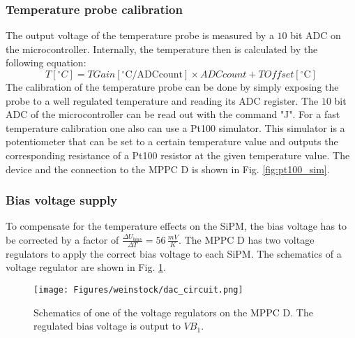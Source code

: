 \documentclass[]{article}
\begin{document}
\subsubsection*{Temperature probe calibration}

The output voltage of the temperature probe is measured by a $10$ bit ADC on the microcontroller. Internally, the temperature then is calculated by the following equation:
\begin{equation}
	T[^{\circ}C] = TGain[^{\circ}\text{C/ADCcount}] \times ADCcount + TOffset[^{\circ}\text{C}] 	
\end{equation}
The calibration of the temperature probe can be done by simply exposing the probe to a well regulated temperature and reading its ADC register. The $10$ bit ADC of the microcontroller
can be read out with the command "J". For a fast temperature calibration one also can use a Pt100 simulator. This simulator is a potentiometer that can be set to a certain 
temperature value and outputs the corresponding resistance of a Pt100 resistor at the given temperature value. The device and the connection to the MPPC D is shown in Fig. \ref{fig:pt100_sim}.

\newpage

\subsubsection{Bias voltage supply}

To compensate for the temperature effects on the SiPM, the bias voltage has to be corrected by a factor of $\frac{\Delta U_{bias}}{\Delta T} = 56\,\frac{mV}{K}$. The MPPC D has two 
voltage regulators to apply the correct bias voltage to each SiPM. The schematics of a voltage regulator are shown in Fig. \ref{voltage_regulator}. 
	
	\begin{figure}[t]
		\centering
			\texttt{[image: Figures/weinstock/dac\_circuit.png]}
		\caption{Schematics of one of the voltage regulators on the MPPC D. The regulated bias voltage is output to $VB_1$.}
		\label{voltage_regulator}
	\end{figure}	
\end{document}
